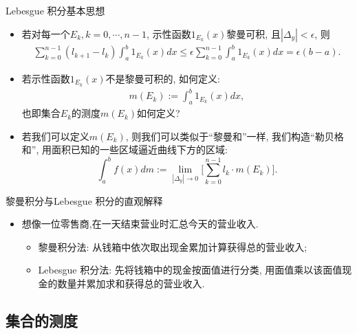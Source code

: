 \documentclass[Prob-All.tex]{subfiles}
\begin{document}
\begin{frame}{{\rm Lebesgue} 积分基本思想}

	\begin{itemize}[<+-|alert@+>]

		\item  若对每一个$E_k, k=0, \cdots, n-1$, 示性函数$1_{E_k}(x)$黎曼可积, 且$|\Delta_y|<\epsilon$, 则
		\begin{align*}
			\sum_{k=0}^{n-1}(l_{k+1}-l_k)\int_{a}^{b} 1_{E_k}(x)dx\leq \epsilon \sum_{k=0}^{n-1}\int_{a}^{b}1_{E_k}(x)dx=\epsilon (b-a).
		\end{align*}


		\item  若示性函数$1_{E_k}(x)$不是黎曼可积的,  如何定义:
		\begin{align*}
			m(E_k):=\int_{a}^{b}1_{E_k}(x)dx,
		\end{align*}
		也即集合$E_k$的测度$m(E_k)$如何定义?


		\item 若我们可以定义$m(E_k)$, 则我们可以类似于“黎曼和”一样, 我们构造“勒贝格和”, 用面积已知的一些区域逼近曲线下方的区域:
		\[\int_a^bf(x)dm:=\lim_{|\Delta_y|\rightarrow 0}\Big[\sum_{k=0}^{n-1}l_k\cdot m(E_k)\Big].\]
	\end{itemize}

\end{frame}
\begin{frame}{黎曼积分与{\rm Lebesgue} 积分的直观解释}

	\begin{itemize}[<+-|alert@+>]%
		\item 想像一位零售商,在一天结束营业时汇总今天的营业收入.
		\begin{itemize}
			\item 黎曼积分法: 从钱箱中依次取出现金累加计算获得总的营业收入;
			\item{\rm Lebesgue} 积分法: 先将钱箱中的现金按面值进行分类, 用面值乘以该面值现金的数量并累加求和获得总的营业收入.
		\end{itemize}
	\end{itemize}

\end{frame}




\subsection{集合的测度}
\end{document}
